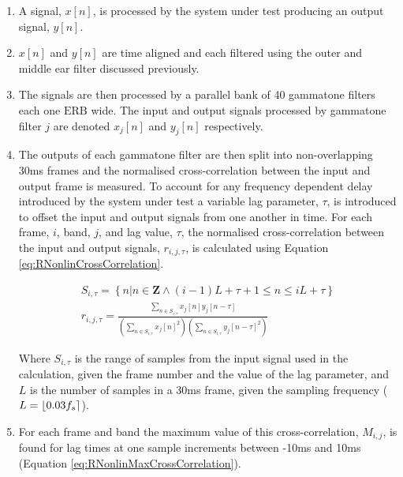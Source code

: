 			\begin{enumerate}
				\item A signal, $x[n]$, is processed by the system under test producing an output signal,
					$y[n]$.

				\item $x[n]$ and $y[n]$ are time aligned and each filtered using the outer and middle ear
					filter discussed previously.

				\item The signals are then processed by a parallel bank of 40 gammatone filters each one
					$\mathrm{ERB}$ wide. The input and output signals processed by gammatone filter $j$
					are denoted $x_j[n]$ and $y_j[n]$ respectively.

				\item The outputs of each gammatone filter are then split into non-overlapping 30ms frames
					and the normalised cross-correlation between the input and output frame is measured.
					To account for any frequency dependent delay introduced by the system under test a
					variable lag parameter, $\tau$, is introduced to offset the input and output signals
					from one another in time. For each frame, $i$, band, $j$, and lag value, $\tau$, the
					normalised cross-correlation between the input and output signals, $r_{i,j,\tau}$,
					is calculated using Equation \ref{eq:RNonlinCrossCorrelation}.

					\begin{gather}
						S_{i,\tau} = \left\{ n | n \in \textbf{Z} 
							     \land (i-1)L+\tau+1 \leq n \leq iL + \tau \right\} \nonumber \\
						r_{i,j,\tau} = \frac{\sum_{n \in S_{i,\tau}} x_{j}[n]y_{j}[n-\tau]}
							{\left( \sum_{n \in S_{i,\tau}} x_{j}[n]^{2} \right) 
							\left( \sum_{n \in S_{i,\tau}} y_{j}[n-\tau]^{2} \right)}
						\label{eq:RNonlinCrossCorrelation}
					\end{gather}

					Where $S_{i,\tau}$ is the range of samples from the input signal used in the
					calculation, given the frame number and the value of the lag parameter, and $L$ is
					the number of samples in a 30ms frame, given the sampling frequency ($L =
					\left\lfloor0.03f_{s}\right\rceil$). 

				\item For each frame and band the maximum value of this cross-correlation, $M_{i,j}$, is
					found for lag times at one sample increments between -10ms and 10ms (Equation
					\ref{eq:RNonlinMaxCrossCorrelation}).


\end{enumerate}
